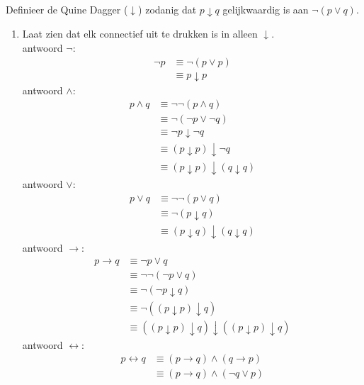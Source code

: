 \begin{answer}\mbox{}\\ %
Definieer de Quine Dagger ($\downarrow$) zodanig dat $p\downarrow q$ gelijkwaardig is aan $\neg(p\lor q)$.
\begin{enumerate}[label=\textit{\alph*.}]
\item Laat zien dat elk connectief uit te drukken is in alleen $\downarrow$. \\
antwoord $\neg$:
\begin{align}
\neg p &\equiv \neg (p \vee p) \tag{St-2.3.2: 1}\\
&\equiv p\downarrow p \tag{Quine Dagger}
\end{align}
antwoord $\land$:
\begin{align}
p \wedge q &\equiv \neg \neg (p \wedge q) \tag{St-2.3.2: 1}\\
&\equiv \neg (\neg p \vee \neg q) \tag{St-2.3.2: 10}\\
&\equiv \neg p \downarrow \neg q \tag{Quine Dagger} \\ 
&\equiv (p \downarrow p) \downarrow \neg q \tag{zie antwoord $\neg$} \\
&\equiv (p \downarrow p) \downarrow (q\downarrow q) \tag{zie antwoord $\neg$}
\end{align}
antwoord $\lor$:
\begin{align}
p \vee q &\equiv \neg \neg (p \vee q) \tag{St-2.3.2: 1}\\
&\equiv \neg (p\downarrow q) \tag{Quine Dagger}\\
&\equiv (p\downarrow q)\downarrow (q\downarrow q) \tag{zie antwoord $\neg$}
\end{align}
antwoord $\rightarrow$:
\begin{align}
p \rightarrow q &\equiv \neg p \vee q \tag{St-2.3.2: 7}\\
&\equiv \neg \neg (\neg p\vee q) \tag{St-2.3.2: 1}\\
&\equiv \neg (\neg p\downarrow q) \tag{Quine Dagger}\\
&\equiv \neg ((p\downarrow p)\downarrow q) \tag{zie antwoord $\neg$}\\
&\equiv ((p\downarrow p)\downarrow q) \downarrow ((p\downarrow p)\downarrow q) \tag{zie antwoord $\neg$}
\end{align}
antwoord $\leftrightarrow$:
\begin{align}
p \leftrightarrow q &\equiv (p\rightarrow q) \wedge (q\rightarrow p) \tag{St-2.3.2: 4}\\
&\equiv (p\rightarrow q) \wedge (\neg q \vee p) \tag{St-2.3.2: 7}\\

\end{align}
\end{enumerate}
\end{answer}
